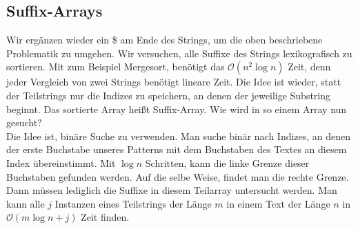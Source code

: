 \documentclass[a4paper, 12pt]{article}
\begin{document}
	\subsection{Suffix-Arrays}
	Wir ergänzen wieder ein \$ am Ende des Strings, um die oben beschriebene Problematik zu umgehen. Wir versuchen, alle Suffixe des Strings lexikografisch zu sortieren. Mit zum Beispiel Mergesort, benötigt das $\mathcal{O}(n^2\log n)$ Zeit, denn jeder Vergleich von zwei Strings benötigt lineare Zeit. Die Idee ist wieder, statt der Teilstrings nur die Indizes zu speichern, an denen der jeweilige Substring beginnt. Das sortierte Array heißt Suffix-Array. Wie wird in so einem Array nun gesucht?\\
	Die Idee ist, binäre Suche zu verwenden. Man suche binär nach Indizes, an denen der erste Buchstabe unseres Patterns mit dem Buchstaben des Textes an diesem Index übereinstimmt. Mit $\log n$ Schritten, kann die linke Grenze dieser Buchstaben gefunden werden. Auf die selbe Weise, findet man die rechte Grenze. Dann müssen lediglich die Suffixe in diesem Teilarray untersucht werden. Man kann alle $j$ Instanzen eines Teilstrings der Länge $m$ in einem Text der Länge $n$ in $\mathcal{O}(m \log n + j)$ Zeit finden.
\end{document}
